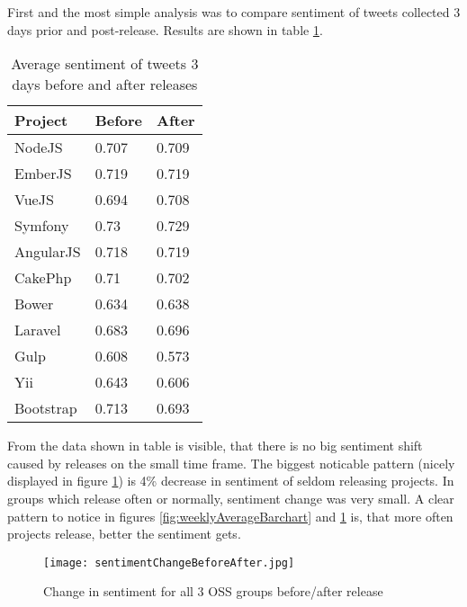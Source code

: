 First and the most simple analysis was to compare sentiment of tweets collected 3 days prior and post-release. Results are shown in table \ref{table:BeforeAfterReleaseSentiment}.

\begin{table}[H]
\centering
\begin{tabular}{ |p{3cm}|p{3cm}|p{3cm}|}
 \hline
\textbf{Project }& \textbf{Before}& \textbf{After}\\
 \hline
 NodeJS   & 0.707 & 0.709\\ \hline
 EmberJS   & 0.719 & 0.719\\ \hline
 VueJS   & 0.694 & 0.708\\ \hline 
 Symfony & 0.73 & 0.729\\ \hline   
 AngularJS   & 0.718 & 0.719\\ \hline
 CakePhp & 0.71 & 0.702\\ \hline 
 Bower   & 0.634 & 0.638\\ \hline 
 Laravel & 0.683 & 0.696\\ \hline
 Gulp & 0.608 & 0.573\\ \hline
 Yii & 0.643 & 0.606\\ \hline
 Bootstrap & 0.713 & 0.693\\ \hline
\end{tabular}
\caption{Average sentiment of tweets 3 days before and after releases}
\label{table:BeforeAfterReleaseSentiment}
\end{table}

From the data shown in table is visible, that there is no big sentiment shift caused by releases on the small time frame. The biggest noticable pattern (nicely displayed in figure \ref{fig:sentimentChangeBeforeAfter}) is 4\% decrease in sentiment of seldom releasing projects. In groups which release often or normally, sentiment change was very small. A clear pattern to notice in figures \ref{fig:weeklyAverageBarchart} and \ref{fig:sentimentChangeBeforeAfter} is, that more often projects release, better the sentiment gets.

\begin{figure}[H]%
    \centering
	\texttt{[image: sentimentChangeBeforeAfter.jpg]}
    \caption{Change in sentiment for all 3 OSS groups before/after release}%
    \label{fig:sentimentChangeBeforeAfter}%
\end{figure}
